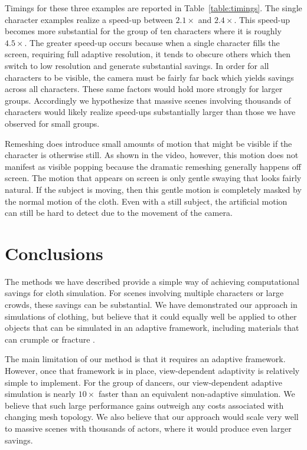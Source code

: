 \documentclass[10pt,journal,compsoc,twoside]{TexInputs/IEEEtran}
\begin{document}
Timings for these three examples are reported in Table~\ref{table:timings}. The single character examples
realize a speed-up between $2.1\times$ and $2.4\times$. This speed-up becomes
more substantial for the group of ten characters where it is roughly
$4.5\times$. The greater speed-up occurs because when a single character fills
the screen, requiring full adaptive resolution, it tends to obscure others
which then switch to low resolution and generate substantial savings. In order
for all characters to be visible, the camera must be fairly far back which
yields savings across all characters. These same factors would hold more
strongly for larger groups. Accordingly we hypothesize that massive scenes
involving thousands of characters would likely realize speed-ups substantially
larger than those we have observed for small groups.


Remeshing does introduce small amounts of motion that might be visible if
the character is otherwise still. As shown in the video, however, this motion
does not manifest as visible popping because the dramatic remeshing generally
happens off screen. The motion that appears on screen is only gentle swaying that
looks fairly natural. If the subject is moving, then this gentle motion is
completely masked by the normal motion of the cloth. Even with a still subject, the
artificial motion can still be hard to detect due to the movement of the camera.


\section{Conclusions}

The methods we have described provide a simple way of achieving computational
savings for cloth simulation. For scenes involving multiple characters or large
crowds, these savings can be substantial. We have demonstrated our approach in
simulations of clothing, but believe that it could equally well be applied to
other objects that can be simulated in an adaptive framework, including
materials that can crumple \cite{Narain:2013:FCA} or
fracture \cite{Pfaff:2014:ATC}.

The main limitation of our method is that it requires an adaptive framework.
However, once that framework is in place, view-dependent adaptivity is
relatively simple to implement. For the group of dancers, our view-dependent adaptive
simulation is nearly $10\times$ faster than an equivalent non-adaptive simulation. We
believe that such large performance gains outweigh any costs associated
with changing mesh topology. We also believe that our approach
would scale very well to massive scenes with thousands of actors, where it would
produce even larger savings.
\end{document}
